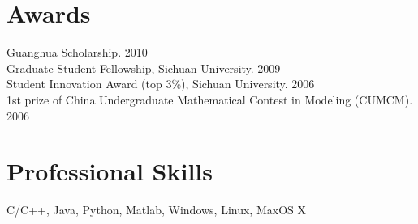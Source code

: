 \documentclass[line,margin]{res}
\begin{document}
\begin{resume}
 
\section{\sc Awards}


Guanghua Scholarship.  \hfill       2010\\
Graduate Student Fellowship, Sichuan University.  \hfill       2009\\
Student Innovation Award (top 3\%), Sichuan University.  \hfill       2006 \\%
1st prize of China Undergraduate Mathematical Contest in Modeling (CUMCM).  \hfill       2006

\section{\sc Professional Skills}
\smallskip

C/C++, Java, Python, Matlab, Windows, Linux, MaxOS X

\end{resume}

%
%
\end{document}
